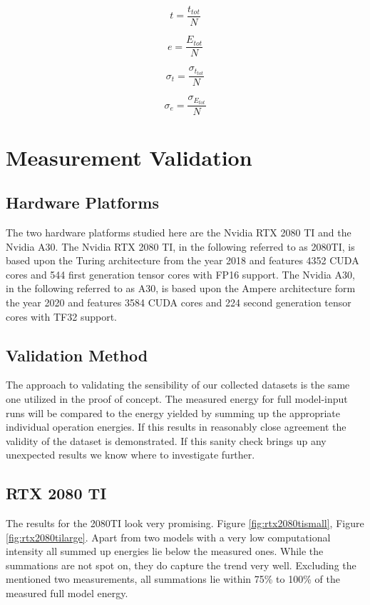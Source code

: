 \documentclass[conference]{IEEEtran}
\begin{document}
\begin{equation}
t = \frac{t_{tot}}{N}
\end{equation}

\begin{equation}
e = \frac{E_{tot}}{N}
\end{equation}

\begin{equation}
\sigma_t = \frac{\sigma_{t_{tot}}}{N}
\end{equation}

\begin{equation}
\sigma_e = \frac{\sigma_{E_{tot}}}{N}
\end{equation}

\section{Measurement Validation}

\subsection{Hardware Platforms}
The two hardware platforms studied here are the Nvidia RTX 2080 TI and the Nvidia A30. The Nvidia RTX 2080 TI, in the following referred to as 2080TI, is based upon the Turing architecture from the year 2018 and features 4352 CUDA cores and 544 first generation tensor cores with FP16 support. The Nvidia A30, in the following referred to as A30, is based upon the Ampere architecture form the year 2020 and features 3584 CUDA cores and 224 second generation tensor cores with TF32 support.\\

\subsection{Validation Method}
The approach to validating the sensibility of our collected datasets is the same one utilized in the proof of concept. The measured energy for full model-input runs will be compared to the energy yielded by summing up the appropriate individual operation energies. If this results in reasonably close agreement the validity of the dataset is demonstrated. If this sanity check brings up any unexpected results we know where to investigate further.


\subsection{RTX 2080 TI}
The results for the 2080TI look very promising. Figure \ref{fig:rtx2080tismall}, Figure \ref{fig:rtx2080tilarge}. Apart from two models with a very low computational intensity all summed up energies lie below the measured ones. While the summations are not spot on, they do capture the trend very well. Excluding the mentioned two measurements, all summations lie within 75\% to 100\% of the measured full model energy.
\end{document}
